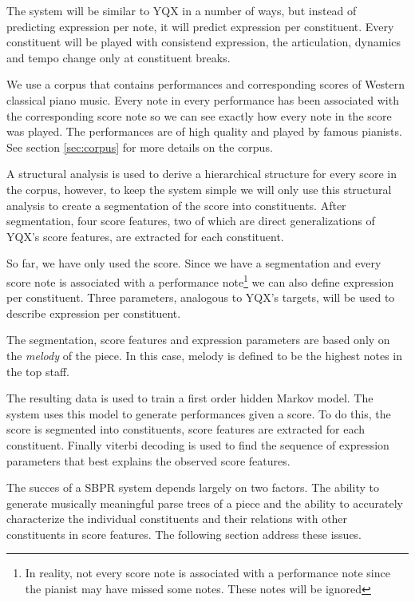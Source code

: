 \documentclass[a4paper,10pt]{article}
\begin{document}

The system will be similar to YQX in a number of ways, but instead of predicting expression per note, it will predict expression per constituent. Every constituent will be played with consistend expression, the articulation, dynamics and tempo change only at constituent breaks.

We use a corpus that contains performances and corresponding scores of Western classical piano music. Every note in every performance has been associated with the corresponding score note so we can see exactly how every note in the score was played. The performances are of high quality and played by famous pianists. See section \ref{sec:corpus} for more details on the corpus.

A structural analysis is used to derive a hierarchical structure for every score in the corpus, however, to keep the system simple we will only use this structural analysis to create a segmentation of the score into constituents. After segmentation, four score features, two of which are direct generalizations of YQX's score features, are extracted for each constituent. 

So far, we have only used the score. Since we have a segmentation and every score note is associated with a performance note\footnote{In reality, not every score note is associated with a performance note since the pianist may have missed some notes. These notes will be ignored} we can also define expression per constituent. Three parameters, analogous to YQX's targets, will be used to describe expression per constituent.

The segmentation, score features and expression parameters are based only on the \textit{melody} of the piece. In this case, melody is defined to be the highest notes in the top staff.

The resulting data is used to train a first order hidden Markov model. The system uses this model to generate performances given a score. To do this, the score is segmented into constituents, score features are extracted for each constituent. Finally viterbi decoding is used to find the sequence of expression parameters that best explains the observed score features.

The succes of a SBPR system depends largely on two factors. The ability to generate musically meaningful parse trees of a piece and the ability to accurately characterize the individual constituents and their relations with other constituents in score features. The following section address these issues. 
\end{document}
